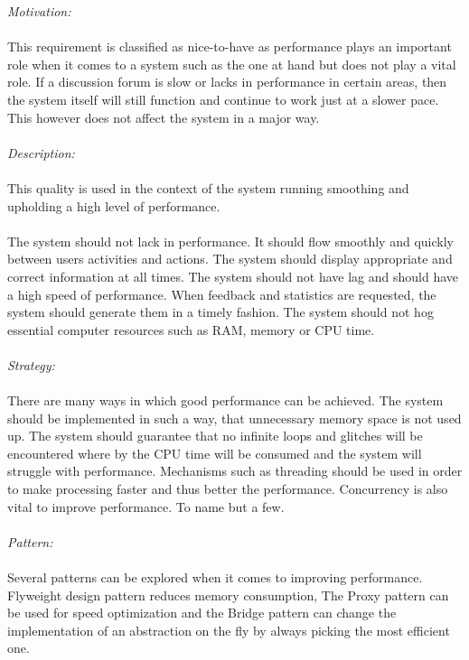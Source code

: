 \documentclass[a4paper,12pt]{report}
\begin{document}
		\emph{Motivation: }\\\\ This requirement is classified as nice-to-have  as performance plays an important role when it comes to a system such as the one at hand but does not play a vital role. If a discussion forum is slow or lacks in performance in certain areas, then the system itself will still function and continue to work just at a slower pace. This however does not affect the system in a major way.	\\\\
		
		\emph{Description: }\\\\This quality is used in the context of the system running smoothing and upholding a high level of performance. \\\\
		The system should not lack in performance. It should flow smoothly and quickly between users activities and actions. The system should display appropriate and correct information at all times. The system should not have lag and should have a high speed of performance. When feedback and statistics are requested, the system should generate them in a timely fashion. The system should not hog essential computer resources such as RAM, memory or CPU time.\\\\
		
		\emph{Strategy: }\\\\ There are many ways in which good performance can be achieved. The system should be implemented in such a way, that unnecessary memory space is not used up. The system should guarantee that no infinite loops and glitches will be encountered where by the CPU time will be consumed and the system will struggle with performance. Mechanisms such as threading should be used in order to make processing faster and thus better the performance. Concurrency is also vital to improve performance. To name but a few. \\\\
		
		\emph{Pattern: }\\\\ Several patterns can be explored when it comes to improving performance. Flyweight design pattern reduces memory consumption, The Proxy pattern can be used for speed optimization and the Bridge pattern can change the implementation of an abstraction on the fly by always picking the most efficient one.\\
		
\end{document}
